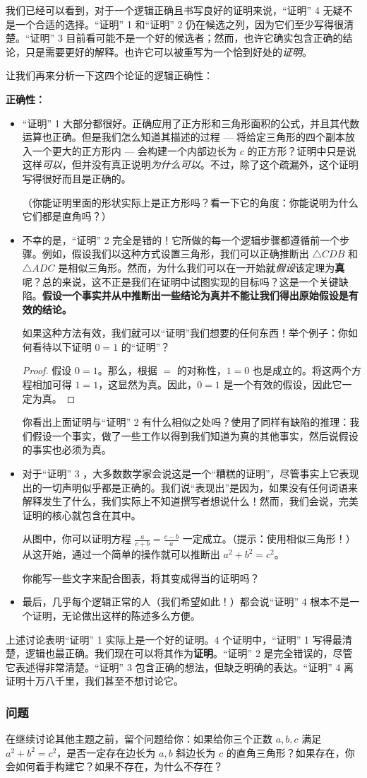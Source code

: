 我们已经可以看到，对于一个逻辑正确且书写良好的证明来说，``证明'' 4 无疑不是一个合适的选择。``证明'' 1 和``证明'' 2 仍在候选之列，因为它们至少写得很清楚。``证明'' 3 目前看可能不是一个好的候选者；然而，也许它确实包含正确的结论，只是需要更好的解释。也许它可以被重写为一个恰到好处的\emph{证明}。

让我们再来分析一下这四个论证的逻辑正确性：

\textbf{正确性：}

\begin{itemize}
    \item ``证明'' 1 大部分都很好。正确应用了正方形和三角形面积的公式，并且其代数运算也正确。但是我们怎么知道其描述的过程 --- 将给定三角形的四个副本放入一个更大的正方形内 --- 会构建一个内部边长为 $c$ 的正方形？证明中只是说这样\emph{可以}，但并没有真正说明\emph{为什么可以}。不过，除了这个疏漏外，这个证明写得很好而且是正确的。
    
    （你能证明里面的形状实际上是正方形吗？看一下它的角度：你能说明为什么它们都是直角吗？）
    \item 不幸的是，``证明'' 2 完全是错的！它所做的每一个逻辑步骤都遵循前一个步骤。例如，假设我们以这种方式设置三角形，我们可以正确推断出 $\triangle CDB$ 和 $\triangle ADC$ 是相似三角形。然而，为什么我们可以在一开始就\emph{假设}该定理为\textbf{真}呢？总的来说，这不正是我们在证明中试图实现的目标吗？这是一个关键缺陷。\textbf{假设一个事实并从中推断出一些结论为真并不能让我们得出原始假设是有效的结论。}
    
    如果这种方法有效，我们就可以``证明''我们想要的任何东西！举个例子：你如何看待以下证明 $0 = 1$ 的``证明''？
    \begin{proof}
        假设 $0 = 1$。那么，根据 $=$ 的对称性，$1 = 0$ 也是成立的。将这两个方程相加可得 $1 = 1$，这显然为真。因此，$0 = 1$ 是一个有效的假设，因此它一定为真。
    \end{proof}
    你看出上面证明与``证明'' 2 有什么相似之处吗？使用了同样有缺陷的推理：我们假设一个事实，做了一些工作以得到我们知道为真的其他事实，然后说假设的事实也必须为真。
    \item 对于``证明'' 3 ，大多数数学家会说这是一个``糟糕的证明''，尽管事实上它表现出的一切声明似乎都是正确的。我们说``表现出''是因为，如果没有任何词语来解释发生了什么，我们实际上不知道撰写者想说什么！然而，我们会说，完美证明的核心就包含在其中。
    
    从图中，你可以证明方程 $\frac{a}{c+b} = \frac{c-b}{a}$ 一定成立。（提示：使用相似三角形！）从这开始，通过一个简单的操作就可以推断出 $a^2 + b^2 = c^2$。

    你能写一些文字来配合图表，将其变成得当的证明吗？
    \item 最后，几乎每个逻辑正常的人（我们希望如此！）都会说``证明'' 4 根本不是一个证明，无论做出这样的陈述多么方便。
\end{itemize}

上述讨论表明``证明'' 1 实际上是一个好的证明。4 个证明中，``证明'' 1 写得最清楚，逻辑也最正确。我们现在可以将其作为\textbf{证明}。``证明'' 2 是完全错误的，尽管它表述得非常清楚。``证明'' 3 包含正确的想法，但缺乏明确的表达。``证明'' 4 离证明十万八千里，我们甚至不想讨论它。

\subsubsection*{问题}

在继续讨论其他主题之前，留个问题给你：如果给你三个正数 $a,b,c$ 满足 $a^2+b^2=c^2$，是否一定存在边长为 $a,b$ 斜边长为 $c$ 的直角三角形？如果存在，你会如何着手构建它？如果不存在，为什么不存在？
